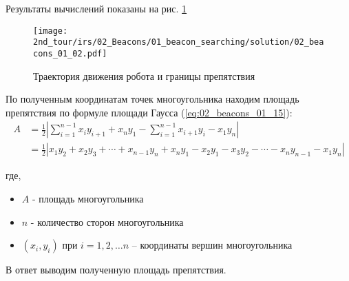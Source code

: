 Результаты вычислений показаны на рис. \ref{fig:02_beacons_01_02}

\begin{figure}[h!]
	\centering
	\texttt{[image: 2nd\_tour/irs/02\_Beacons/01\_beacon\_searching/solution/02\_beacons\_01\_02.pdf]}
	\caption{Траектория движения робота и границы препятствия}
	\label{fig:02_beacons_01_02}
\end{figure}


По полученным координатам точек многоугольника находим площадь препятствия по формуле площади Гаусса (\ref{eq:02_beacons_01_15}):
\begin{equation}
	\begin{aligned}
		A & =\frac{1}{2} 
		\left|\sum_{i=1}^{n-1} x_i y_{i+1} + x_n y_1 - \sum_{i=1}^{n-1} x_{i+1} y_i -  x_1 y_n \right| \\ 
		& =
		\frac {1}{2} |x_1 y_2 + x_2 y_3 + \cdots + x_{n-1}y_n + x_n y_1 - x_2 y_1 - x_3 y_2- \cdots - x_n y_{n-1} - x_1 y_n |
	\end{aligned}
	\label{eq:02_beacons_01_15}
\end{equation}

где,
\begin{itemize}
	\item $A$ - площадь многоугольника
	\item $n$ - количество сторон многоугольника
	\item $(x_i, y_i)$ при $i = 1, 2, \dots n $ – координаты вершин многоугольника	
\end{itemize} 


В ответ выводим полученную площадь препятствия.


\codeExample

